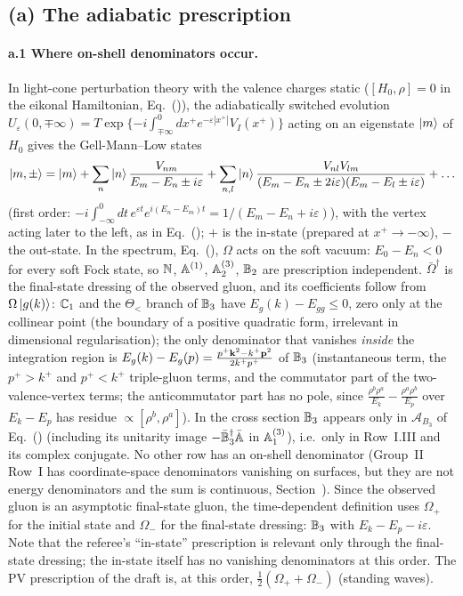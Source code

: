 \subsection{(a) The adiabatic prescription}\label{pr:a}

\paragraph{a.1 Where on-shell denominators occur.} In light-cone perturbation theory with the valence charges static ($[H_0,\rho]=0$ in the eikonal Hamiltonian, Eq.~()), the adiabatically switched evolution $U_\varepsilon(0,\mp\infty)=T\exp\{-i\int_{\mp\infty}^0dx^+e^{-\varepsilon|x^+|}V_I(x^+)\}$ acting on an eigenstate $\ket m$ of $H_0$ gives the Gell-Mann--Low states
\begin{align}
\ket{m,\pm}=\ket m+\sum_n\ket n\frac{V_{nm}}{E_m-E_n\pm i\varepsilon}+\sum_{n,l}\ket n\frac{V_{nl}V_{lm}}{(E_m-E_n\pm2i\varepsilon)(E_m-E_l\pm i\varepsilon)}+\dots
\end{align}
(first order: $-i\int_{-\infty}^0dt\,e^{\varepsilon t}e^{i(E_n-E_m)t}=1/(E_m-E_n+i\varepsilon)$), with the vertex acting later to the left, as in Eq.~(); $+$ is the in-state (prepared at $x^+\to-\infty$), $-$ the out-state. In the spectrum, Eq.~(), $\Omega$ acts on the soft vacuum: $E_0-E_n<0$ for every soft Fock state, so $\mathbb{N}$, $\mathbb{A}^{(1)}$, $\mathbb{A}^{(3)}_2$, $\mathbb{B}_2$ are prescription independent. $\bar\Omega^\dagger$ is the final-state dressing of the observed gluon, and its coefficients follow from $\Omega\ket{g(k)}$: $\mathbb{C}_1$ and the $\Theta_<$ branch of $\mathbb{B}_3$ have $E_g(k)-E_{gg}\le0$, zero only at the collinear point (the boundary of a positive quadratic form, irrelevant in dimensional regularisation); the only denominator that vanishes \emph{inside} the integration region is $E_g(k)-E_g(p)=\frac{p^+\mathbf{k}^2-k^+\mathbf{p}^2}{2k^+p^+}$ of $\mathbb{B}_3$ (instantaneous term, the $p^+>k^+$ and $p^+<k^+$ triple-gluon terms, and the commutator part of the two-valence-vertex terms; the anticommutator part has no pole, since $\frac{\rho^b\rho^a}{E_k}-\frac{\rho^a\rho^b}{E_p}$ over $E_k-E_p$ has residue $\propto[\rho^b,\rho^a]$). In the cross section $\mathbb{B}_3$ appears only in $\mathcal A_{B_3}$ of Eq.~() (including its unitarity image $-\bar{\mathbb{B}}_3^\dagger\bar{\mathbb{A}}$ in $\mathbb{A}^{(3)}_1$), i.e.\ only in Row~I.III and its complex conjugate. No other row has an on-shell denominator (Group~II Row~I has coordinate-space denominators vanishing on surfaces, but they are not energy denominators and the sum is continuous, Section~). Since the observed gluon is an asymptotic final-state gluon, the time-dependent definition uses $\Omega_+$ for the initial state and $\Omega_-$ for the final-state dressing: $\mathbb{B}_3$ with $E_k-E_p-i\varepsilon$. Note that the referee's ``in-state'' prescription is relevant only through the final-state dressing; the in-state itself has no vanishing denominators at this order. The PV prescription of the draft is, at this order, $\frac12(\Omega_++\Omega_-)$ (standing waves).

